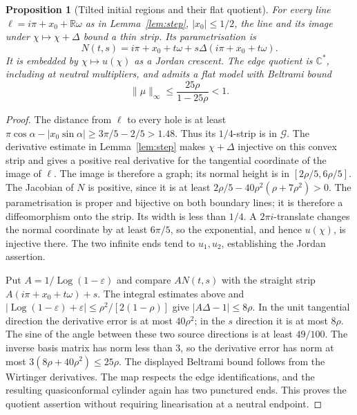 \documentclass[11pt]{article}
\newtheorem{proposition}[theorem]{Proposition}
\newcommand{\C}{\mathbb C}
\newcommand{\Log}{\operatorname{Log}}
\begin{document}
\begin{proposition}[Tilted initial regions and their flat quotient]
For every line $\ell=i\pi+x_0+\mathbb R\omega$ as in
Lemma~\ref{lem:step}, $|x_0|\le1/2$, the line and its image under
$\chi\mapsto\chi+\Delta$ bound a thin strip. Its parametrisation is
\[
 N(t,s)=i\pi+x_0+t\omega+s\Delta(i\pi+x_0+t\omega).
\]
It is embedded by $\chi\mapsto u(\chi)$ as a Jordan crescent. The edge
quotient is $\C^*$, including at neutral multipliers, and admits a flat
model with Beltrami bound
\[
 \|\mu\|_\infty\le\frac{25\rho}{1-25\rho}<1.
\]
\end{proposition}
\begin{proof}
The distance from $\ell$ to every hole is at least
$\pi\cos\alpha-|x_0\sin\alpha|\ge3\pi/5-2/5>1.48$.
Thus its $1/4$-strip is in $\mathcal G$.
The derivative estimate in Lemma~\ref{lem:step} makes
$\chi+\Delta$ injective on this convex strip and gives a positive real
derivative for the tangential coordinate of the image of $\ell$.
The image is therefore a graph; its normal height is in
$[2\rho/5,6\rho/5]$. The Jacobian of $N$ is positive, since it is at least
$2\rho/5-40\rho^2(\rho+7\rho^2)>0$.
The parametrisation is proper and bijective on both boundary lines;
it is therefore a diffeomorphism onto the strip. Its width is less than
$1/4$. A $2\pi i$-translate changes the normal coordinate by at least
$6\pi/5$, so the exponential, and hence $u(\chi)$, is injective there.
The two infinite ends tend to $u_1,u_2$, establishing the Jordan assertion.

Put $A=1/\Log(1-\varepsilon)$ and compare $AN(t,s)$ with the straight strip
$A(i\pi+x_0+t\omega)+s$. The integral estimates above and
$|\Log(1-\varepsilon)+\varepsilon|\le\rho^2/[2(1-\rho)]$ give
$|A\Delta-1|\le8\rho$. In the unit tangential direction the derivative
error is at most $40\rho^2$; in the $s$ direction it is at most $8\rho$.
The sine of the angle between these two source directions is at least
$49/100$. The inverse basis matrix has norm less than $3$, so the
derivative error has norm at most $3(8\rho+40\rho^2)\le25\rho$.
The displayed Beltrami bound follows from the Wirtinger derivatives.
The map respects the edge identifications, and the resulting
quasiconformal cylinder again has two punctured ends. This proves the
quotient assertion without requiring linearisation at a neutral endpoint.
\end{proof}
\end{document}
